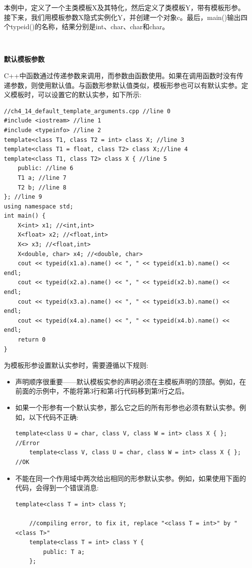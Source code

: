 本例中，定义了一个主类模板X及其特化，然后定义了类模板Y，带有模板形参。接下来，我们用模板参数X隐式实例化Y，并创建一个对象c。最后，main()输出四个typeid()的名称，结果分别是int、char、char和char。 \par

\noindent\textbf{}\ \par
\textbf{默认模板参数} \ \par
C++中函数通过传递参数来调用，而参数由函数使用。如果在调用函数时没有传递参数，则使用默认值。与函数形参默认值类似，模板形参也可以有默认实参。定义模板时，可以设置它的默认实参，如下所示: \par

\begin{lstlisting}[caption={}]
//ch4_14_default_template_arguments.cpp //line 0
#include <iostream> //line 1
#include <typeinfo> //line 2
template<class T1, class T2 = int> class X; //line 3
template<class T1 = float, class T2> class X;//line 4
template<class T1, class T2> class X { //line 5
	public: //line 6
	T1 a; //line 7
	T2 b; //line 8
}; //line 9
using namespace std;
int main() {
	X<int> x1; //<int,int>
	X<float> x2; //<float,int>
	X<> x3; //<float,int>
	X<double, char> x4; //<double, char>
	cout << typeid(x1.a).name() << ", " << typeid(x1.b).name() << endl;
	cout << typeid(x2.a).name() << ", " << typeid(x2.b).name() << endl;
	cout << typeid(x3.a).name() << ", " << typeid(x3.b).name() << endl;
	cout << typeid(x4.a).name() << ", " << typeid(x4.b).name() << endl;
	return 0
}
\end{lstlisting}

为模板形参设置默认实参时，需要遵循以下规则: \par

\begin{itemize}
	\item 声明顺序很重要——默认模板实参的声明必须在主模板声明的顶部。例如，在前面的示例中，不能将第3行和第4行代码移到第9行之后。
	\item 如果一个形参有一个默认实参，那么它之后的所有形参也必须有默认实参。例如，以下代码不正确:
	\begin{lstlisting}[caption={}]
	template<class U = char, class V, class W = int> class X { }; //Error
	template<class V, class U = char, class W = int> class X { }; //OK
	\end{lstlisting}
	\item 不能在同一个作用域中两次给出相同的形参默认实参。例如，如果使用下面的代码，会得到一个错误消息:
	\begin{lstlisting}[caption={}]
	template<class T = int> class Y;
	
	//compiling error, to fix it, replace "<class T = int>" by "<class T>"
	template<class T = int> class Y {
		public: T a;
	};
	\end{lstlisting}
\end{itemize}

